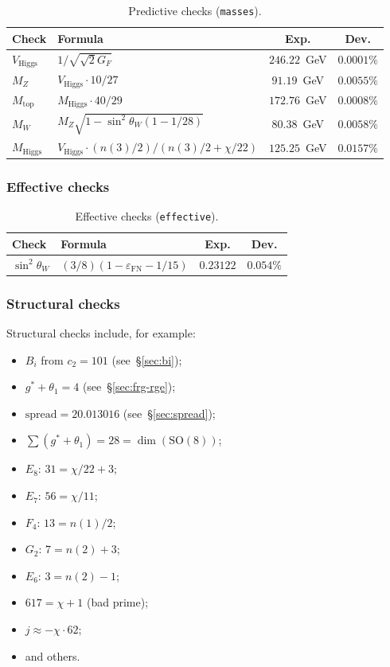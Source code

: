 \documentclass[11pt,a4paper]{article}
\newcommand{\SO}{\ensuremath{\mathrm{SO}}}
\theoremstyle{definition}
\begin{document}
\begin{table}[ht]
\centering
\caption{Predictive checks (\texttt{masses}).}
\label{tab:predictive-checks}
\begin{tabular}{llcc}
\toprule
Check & Formula & Exp. & Dev. \\
\midrule
$V_{\text{Higgs}}$ & $1/\sqrt{\sqrt{2} G_F}$ & $246.22$~GeV & $0.0001\%$ \\
$M_Z$ & $V_{\text{Higgs}} \cdot 10/27$ & $91.19$~GeV & $0.0055\%$ \\
$M_{\text{top}}$ & $M_{\text{Higgs}} \cdot 40/29$ & $172.76$~GeV & $0.0008\%$ \\
$M_W$ & $M_Z \sqrt{1 - \sin^2\theta_W (1-1/28)}$ & $80.38$~GeV & $0.0058\%$ \\
$M_{\text{Higgs}}$ & $V_{\text{Higgs}} \cdot (n(3)/2)/(n(3)/2 + \chi/22)$
    & $125.25$~GeV & $0.0157\%$ \\
\bottomrule
\end{tabular}
\end{table}

\subsubsection{Effective checks}

\begin{table}[ht]
\centering
\caption{Effective checks (\texttt{effective}).}
\label{tab:effective-checks}
\begin{tabular}{llcc}
\toprule
Check & Formula & Exp. & Dev. \\
\midrule
$\sin^2\theta_W$ & $(3/8)(1 - \varepsilon_{\text{FN}} - 1/15)$
    & $0.23122$ & $0.054\%$ \\
\bottomrule
\end{tabular}
\end{table}

\subsubsection{Structural checks}

Structural checks include, for example:
\begin{itemize}
    \item $B_i$ from $c_2 = 101$ (see~\S\ref{sec:bi});
    \item $g^* + \theta_1 = 4$ (see~\S\ref{sec:frg-rge});
    \item $\text{spread} = 20.013016$ (see~\S\ref{sec:spread});
    \item $\sum(g^* + \theta_1) = 28 = \dim(\SO(8))$;
    \item $E_8$: $31 = \chi/22 + 3$;
    \item $E_7$: $56 = \chi/11$;
    \item $F_4$: $13 = n(1)/2$;
    \item $G_2$: $7 = n(2) + 3$;
    \item $E_6$: $3 = n(2) - 1$;
    \item $617 = \chi + 1$ (bad prime);
    \item $j \approx -\chi \cdot 62$;
    \item and others.
\end{itemize}
\end{document}

